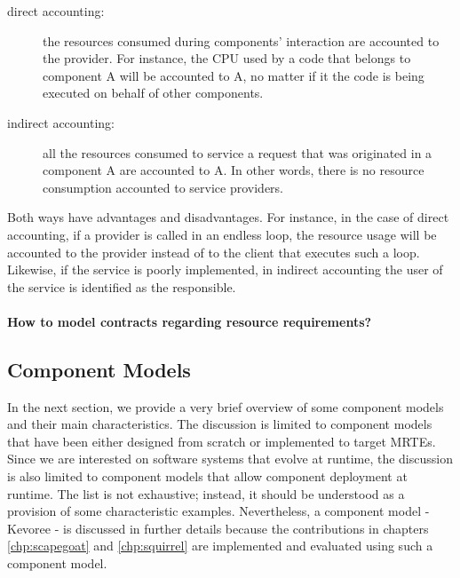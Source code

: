 \begin{description}
\item[direct accounting:] the resources consumed during
components' interaction are accounted to the provider.
For instance, the CPU used by a code that belongs
to component A will be accounted to A, no matter if it the code is being executed on behalf of other components.

\item[indirect accounting:] all the resources consumed to service a request that was originated in a component A are accounted to A.
In other words, there is no resource consumption accounted to service providers.
\end{description}

Both ways have advantages and disadvantages.
For instance, in the case of direct accounting, if a provider is
called in an endless loop, the resource usage will be accounted
to the provider instead of to the client that executes such a loop.
Likewise, if the service is poorly implemented, in indirect accounting the user of the service is identified as the responsible.

\paragraph{How to model contracts regarding resource requirements?}

%
%
%
%

\subsection{Component Models}

In the next section, we provide a very brief overview of some component models and their main characteristics.
The discussion is limited to component models that have been either designed from scratch or implemented to target MRTEs.
Since we are interested on software systems that evolve at runtime, the discussion is also limited to component models that allow component deployment at runtime.
The list is not exhaustive; instead, it should be understood as a provision of some characteristic examples.
Nevertheless, a component model - Kevoree -  is discussed in further details because the contributions in chapters \ref{chp:scapegoat} and \ref{chp:squirrel}
are implemented and evaluated using such a component model.

